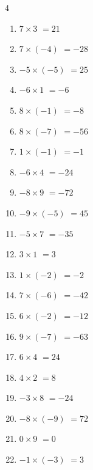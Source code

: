 \begin{multicols}{4}
\begin{enumerate}
  \item $7\times 3$
        $=21$

  \item $7\times (-4)$
        $=-28$

  \item $-5\times (-5)$
        $=25$

  \item $-6\times 1$
        $=-6$

\columnbreak %

\resetques

  \item $8\times (-1)$
        $=-8$

  \item $8\times (-7)$
        $=-56$

  \item $1\times (-1)$
        $=-1$

  \item $-6\times 4$
        $=-24$

  \item $-8\times 9$
        $=-72$

  \item $-9\times (-5)$
        $=45$

  \item $-5\times 7$
        $=-35$

  \item $3\times 1$
        $=3$

  \item $1\times (-2)$
        $=-2$

  \item $7\times (-6)$
        $=-42$

  \item $6\times (-2)$
        $=-12$

  \item $9\times (-7)$
        $=-63$

  \item $6\times 4$
        $=24$

  \item $4\times 2$
        $=8$

  \item $-3\times 8$
        $=-24$

  \item $-8\times (-9)$
        $=72$

  \item $0\times 9$
        $=0$

  \item $-1\times (-3)$
        $=3$


\end{enumerate}
\end{multicols}
